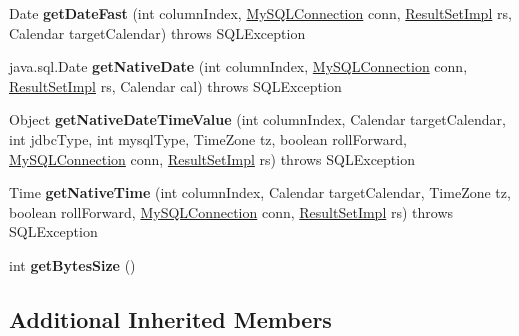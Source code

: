 \begin{DoxyCompactItemize}
\item 
\mbox{\label{classcom_1_1mysql_1_1jdbc_1_1_buffer_row_ac01e3eeb9f6d527d3142388e57d14e47}} 
Date {\bfseries get\+Date\+Fast} (int column\+Index, \mbox{\hyperlink{interfacecom_1_1mysql_1_1jdbc_1_1_my_s_q_l_connection}{My\+S\+Q\+L\+Connection}} conn, \mbox{\hyperlink{classcom_1_1mysql_1_1jdbc_1_1_result_set_impl}{Result\+Set\+Impl}} rs, Calendar target\+Calendar)  throws S\+Q\+L\+Exception 
\item 
\mbox{\label{classcom_1_1mysql_1_1jdbc_1_1_buffer_row_a59a14b5e79d08e93f8bde1e9fdab27d4}} 
java.\+sql.\+Date {\bfseries get\+Native\+Date} (int column\+Index, \mbox{\hyperlink{interfacecom_1_1mysql_1_1jdbc_1_1_my_s_q_l_connection}{My\+S\+Q\+L\+Connection}} conn, \mbox{\hyperlink{classcom_1_1mysql_1_1jdbc_1_1_result_set_impl}{Result\+Set\+Impl}} rs, Calendar cal)  throws S\+Q\+L\+Exception 
\item 
\mbox{\label{classcom_1_1mysql_1_1jdbc_1_1_buffer_row_a3ff9fd5c2b89f52616226cb99794f98d}} 
Object {\bfseries get\+Native\+Date\+Time\+Value} (int column\+Index, Calendar target\+Calendar, int jdbc\+Type, int mysql\+Type, Time\+Zone tz, boolean roll\+Forward, \mbox{\hyperlink{interfacecom_1_1mysql_1_1jdbc_1_1_my_s_q_l_connection}{My\+S\+Q\+L\+Connection}} conn, \mbox{\hyperlink{classcom_1_1mysql_1_1jdbc_1_1_result_set_impl}{Result\+Set\+Impl}} rs)  throws S\+Q\+L\+Exception 
\item 
\mbox{\label{classcom_1_1mysql_1_1jdbc_1_1_buffer_row_ab0064fcd7f830d30f7c0cce34c42fb27}} 
Time {\bfseries get\+Native\+Time} (int column\+Index, Calendar target\+Calendar, Time\+Zone tz, boolean roll\+Forward, \mbox{\hyperlink{interfacecom_1_1mysql_1_1jdbc_1_1_my_s_q_l_connection}{My\+S\+Q\+L\+Connection}} conn, \mbox{\hyperlink{classcom_1_1mysql_1_1jdbc_1_1_result_set_impl}{Result\+Set\+Impl}} rs)  throws S\+Q\+L\+Exception 
\item 
\mbox{\label{classcom_1_1mysql_1_1jdbc_1_1_buffer_row_a41eddd26f3db3b8e0083e63f50a1f64d}} 
int {\bfseries get\+Bytes\+Size} ()
\end{DoxyCompactItemize}
\subsection*{Additional Inherited Members}


